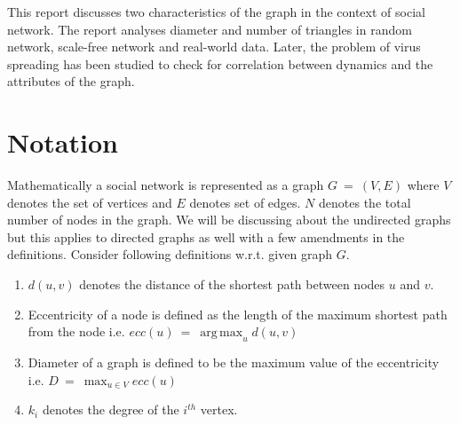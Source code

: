 \documentclass[12pt]{article}
\DeclareMathOperator*{\argmax}{arg\,max}
\begin{document}
\par This report discusses two characteristics of the graph in the context of social network. The report analyses diameter and number of triangles in random network, scale-free network and real-world data. Later, the problem of virus spreading has been studied to check for correlation between dynamics and the attributes of the graph.

\section{Notation}
Mathematically a social network is represented as a graph $G ~=~ (V, E)$ where $V$ denotes the set of vertices and $E$ denotes set of edges. $N$ denotes the total number of nodes in the graph. We will be discussing about the undirected graphs but this applies to directed graphs as well with a few amendments in the definitions. Consider following definitions w.r.t. given graph $G$.
\begin{enumerate}
	\item $d(u, v)$ denotes the distance of the shortest path between nodes $u$ and $v$.
	\item Eccentricity of a node is defined as the length of the maximum shortest path from the node i.e. $ecc(u) ~=~ \argmax_u d(u, v)$
	\item Diameter of a graph is defined to be the maximum value of the eccentricity \\i.e. $D ~=~ \max_{u \in V} ecc(u)$
	\item $k_i$ denotes the degree of the $i^{th}$ vertex.
\end{enumerate}
\end{document}
